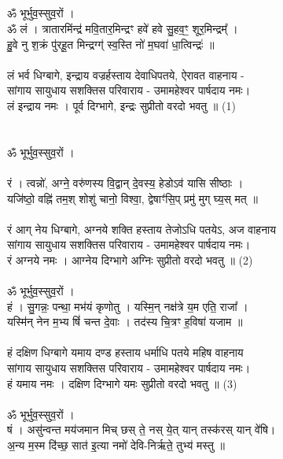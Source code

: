 \subsection{}
ॐ भूर्भुव॒स्सुव॒रों ।\\
ॐ लं । त्रातारमिंन्द्र॑ मवि॒तार॒मिन्द्रꣳ हवे॑ हवे सु॒हव॒ꣳ॒ शूर॒मिन्द्रम्᳚ । \\
हु॒वे नु श॒क्रं पु॑रहू॒त मिन्द्रग्ग्॑ स्व॒स्ति नो॑ म॒घवा॑ धा॒त्विन्द्रः॑ ॥\\
\\
लं भर्व धिग्बागे, इन्द्राय वज्रर्हस्ताय देवाधिपतये, ऐरावत वाहनाय - \\
सांगाय सायुधाय सशक्तिस परिवाराय -  उमामहेश्वर पार्षदाय नमः।\\
लं इन्द्राय नमः ।  पूर्व दिग्भागे, इन्द्रः सुप्रीतो  वरदो भवतु ॥  (1)\\
\\
\\
ॐ भूर्भुव॒स्सुव॒रों ।\\
\\
रं । त्वन्नो॑, अग्ने॒ वरु॑णस्य वि॒द्वान् दे॒वस्य॒ हेडोऽव॑ यासि सीष्ठाः ।\\
यजि॑ष्ठो॒  वह्नि॑ तम॒श् शोशु॑ चानो॒ विश्वा॒, द्वेषाꣳ॑सि॒प् प्रमु॑ मुग् घ्य॒स् मत् ॥ \\
\\
रं आग् नेय धिग्बागे, अग्नये शक्ति हस्ताय तेजोऽधि पतयेऽ, अज वाहनाय\\
सांगाय सायुधाय सशक्तिस परिवाराय -  उमामहेश्वर पार्षदाय नमः।\\
रं अग्नये नमः । आग्नेय दिग्भागे अग्निः सुप्रीतो  वरदो भवतु ॥ (2)\\
\\
ॐ भूर्भुव॒स्सुव॒रों ।\\
हं । सु॒गन्नः॒ पन्था॒ मभ॑यं कृणोतु । यस्मि॒न् नक्ष॑त्रे य॒म एति॒ राजा᳚ ।\\
यस्मि॑न् नेन म॒भ्य षिं॑ चन्त दे॒वाः । तद॑स्य चि॒त्रꣳ ह॒विषा॑ यजाम ॥\\
\\
हं दक्षिण धिग्बागे यमाय दण्ड हस्ताय धर्माधि पतये महिष वाहनाय\\
सांगाय सायुधाय सशक्तिस परिवाराय -  उमामहेश्वर पार्षदाय नमः।\\
हं यमाय नमः । दक्षिण दिग्भागे यमः सुप्रीतो  वरदो भवतु ॥ (3)\\
\\
ॐ भूर्भुव॒स्सुव॒रों ।\\
षं । असु॑न्वन्त मय॑जमान मिच् छस् ते॒ नस् ये॒त् यान् तस्क॑रस् यान् वे॑षि।\\
अ॒न्य म॒स्म दि॑च्छ॒ सात॑ इ॒त्या नमो॑ देवि-निर्ऋते॒ तुभ्य॑ मस्तु ॥\\
